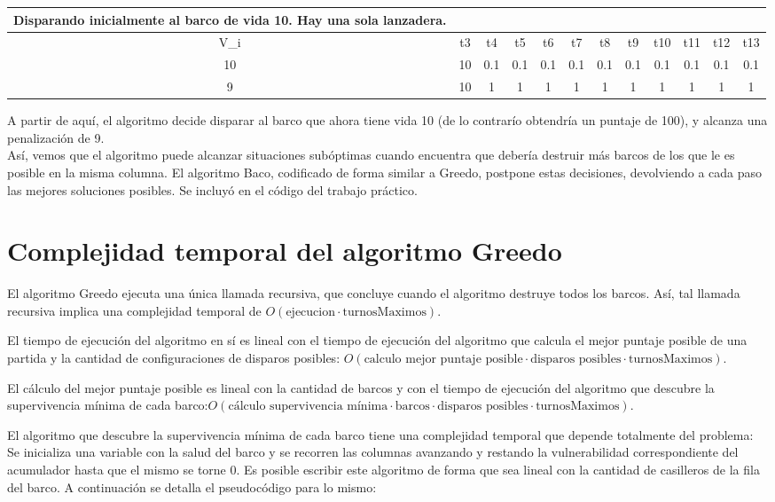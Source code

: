 \documentclass{article}
\begin{document}
\begin{center}
\begin{tabular}{ c | c c c c c c c c c c c}
Disparando inicialmente al barco de vida 10. Hay una sola lanzadera. \\
\hline
V_i &   t3 & t4 & t5 & t6 & t7 & t8 & t9 & t10 & t11 & t12 & t13 \\
\hline
10    &  10 &  0.1 &  0.1 &  0.1 & 0.1 &  0.1 &  0.1 &  0.1 &  0.1 & 0.1  & 0.1 \\
9     &  10 &  1 &  1 &  1 & 1 &  1 &  1 &  1 &  1 & 1  & 1
\end{tabular}
\end{center}

A partir de aquí, el algoritmo decide disparar al barco que ahora tiene vida 10 (de lo contrarío obtendría un puntaje de 100), y alcanza una penalización de 9.\\

Así, vemos que el algoritmo puede alcanzar situaciones subóptimas cuando encuentra que debería destruir más barcos de los que le es posible en la misma columna. El algoritmo Baco, codificado de forma similar a Greedo, postpone estas decisiones, devolviendo a cada paso las mejores soluciones posibles. Se incluyó en el código del trabajo práctico.

\section{Complejidad temporal del algoritmo Greedo}
El algoritmo Greedo ejecuta una única llamada recursiva, que concluye cuando el algoritmo destruye todos los barcos. Así, tal llamada recursiva implica una complejidad temporal de $O(\text{ejecucion} \cdot \text{turnosMaximos})$.

El tiempo de ejecución del algoritmo en sí es lineal con el tiempo de ejecución del algoritmo que calcula el mejor puntaje posible de una partida y la cantidad de configuraciones de disparos posibles: $O(\text{calculo mejor puntaje posible} \cdot \text{disparos posibles} \cdot \text{turnosMaximos})$.

El cálculo del mejor puntaje posible es lineal con la cantidad de barcos y con el tiempo de ejecución del algoritmo que descubre la supervivencia mínima de cada barco:$O(\text{cálculo supervivencia mínima} \cdot \text{barcos}  \cdot \text{disparos posibles} \cdot \text{turnosMaximos})$.

El algoritmo que descubre la supervivencia mínima de cada barco tiene una complejidad temporal que depende totalmente del problema: Se inicializa una variable con la salud del barco y se recorren las columnas avanzando y restando la vulnerabilidad correspondiente del acumulador hasta que el mismo se torne 0. Es posible escribir este algoritmo de forma que sea lineal con la cantidad de casilleros de la fila del barco. A continuación se detalla el pseudocódigo para lo mismo:
\end{document}
